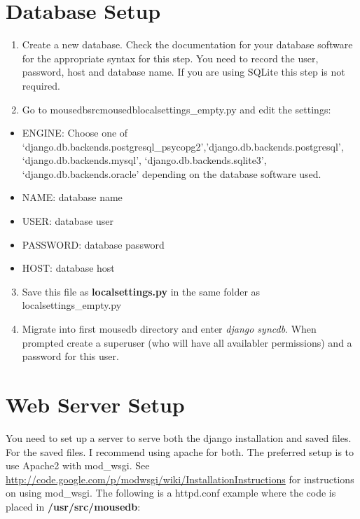 \documentclass[letterpaper,10pt,english]{sphinxmanual}
\begin{document}
\section{Database Setup}
\label{installation:database-setup}\begin{enumerate}
\item {} 
Create a new database.  Check the documentation for your database software for the appropriate syntax for this step.  You need to record the user, password, host and database name.  If you are using SQLite this step is not required.


\item {} 
Go to mousedbsrcmousedblocalsettings\_empty.py and edit the settings:


\end{enumerate}
\begin{itemize}
\item {} 
ENGINE: Choose one of `django.db.backends.postgresql\_psycopg2','django.db.backends.postgresql', `django.db.backends.mysql', `django.db.backends.sqlite3', `django.db.backends.oracle' depending on the database software used.


\item {} 
NAME: database name


\item {} 
USER: database user


\item {} 
PASSWORD: database password


\item {} 
HOST: database host


\end{itemize}
\begin{enumerate}
\setcounter{enumi}{2}
\item {} 
Save this file as \textbf{localsettings.py} in the same folder as localsettings\_empty.py


\item {} 
Migrate into first mousedb directory and enter \emph{django syncdb}.  When prompted create a superuser (who will have all availabler permissions) and a password for this user.


\end{enumerate}


\section{Web Server Setup}
\label{installation:web-server-setup}
You need to set up a server to serve both the django installation and saved files.  For the saved files.  I recommend using apache for both.  The preferred setup is to use Apache2 with mod\_wsgi.  See \href{http://code.google.com/p/modwsgi/wiki/InstallationInstructions}{http://code.google.com/p/modwsgi/wiki/InstallationInstructions} for instructions on using mod\_wsgi.  The following is a httpd.conf example where the code is placed in \textbf{/usr/src/mousedb}:
\end{document}
